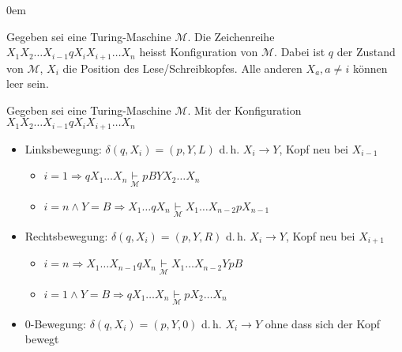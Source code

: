 \begin{description}\itemsep0em
	\item [Konfiguration/Instanzdeskripor]
	Gegeben sei eine Turing-Maschine $\mathcal{M}$. Die Zeichenreihe 
	$X_1X_2\dots X_{i-1}qX_iX_{i+1}\dots X_n$ heisst Konfiguration von $\mathcal{M}$.
	Dabei ist $q$ der Zustand von $\mathcal{M}$, $X_i$ die Position des Lese/Schreibkopfes. Alle anderen $X_a, a \neq i$ können leer sein.

	\item[Bewegung]
	Gegeben sei eine Turing-Maschine $\mathcal{M}$. Mit der Konfiguration $X_1X_2\dots X_{i-1}qX_iX_{i+1}\dots X_n$
	\begin{itemize}
		\item Linksbewegung: $\delta(q, X_i) = (p, Y, L)$ d.\,h. $X_i \rightarrow Y$, Kopf neu bei $X_{i-1}$
		\begin{itemize}\itemsep0em
			\item $i = 1 \Rightarrow qX_1\dots X_n \underset{\mathcal{M}}{\vdash} pBYX_2\dots X_n$
			\item $i = n \wedge Y = B \Rightarrow X_1\dots qX_n \underset{\mathcal{M}}{\vdash} X_1\dots X_{n-2}pX_{n-1}$
		\end{itemize}

		\item Rechtsbewegung: $\delta(q, X_i) = (p, Y, R)$ d.\,h. $X_i \rightarrow Y$, Kopf neu bei $X_{i+1}$
		\begin{itemize}\itemsep0em
			\item $i = n \Rightarrow X_1\dots X_{n-1}qX_n \underset{\mathcal{M}}{\vdash} X_1\dots X_{n-2}YpB$
			\item $i = 1 \wedge Y = B \Rightarrow qX_1\dots X_n \underset{\mathcal{M}}{\vdash} pX_2\dots X_n$
		\end{itemize}
		\item 0-Bewegung: $\delta(q, X_i) = (p, Y, 0)$ d.\,h. $X_i \rightarrow Y$ ohne dass sich der Kopf bewegt
	\end{itemize}


\end{description}
